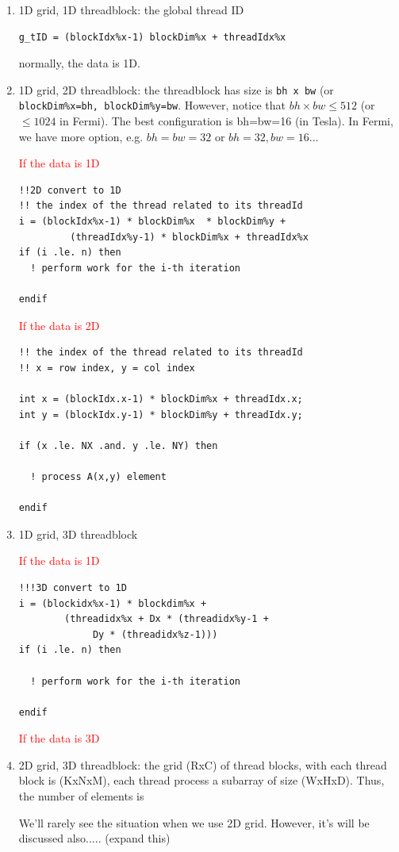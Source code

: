 \begin{enumerate}
\item 1D grid, 1D threadblock: the global thread ID
\begin{lstlisting}
g_tID = (blockIdx%x-1) blockDim%x + threadIdx%x
\end{lstlisting}
normally, the data is 1D. 

\item 1D grid, 2D threadblock: the threadblock has size is
  \verb!bh x bw! (or \verb!blockDim%x=bh, blockDim%y=bw!. However,
  notice that $bh\times bw \le 512$ (or $\le
  1024$ in Fermi). The best configuration is bh=bw=16 (in Tesla). In
  Fermi, we have more option, e.g. $bh=bw=32$ or $bh=32, bw=16$...

  \textcolor{red}{If the data is 1D}
\begin{lstlisting}
!!2D convert to 1D
!! the index of the thread related to its threadId
i = (blockIdx%x-1) * blockDim%x  * blockDim%y + 
         (threadIdx%y-1) * blockDim%x + threadIdx%x 
if (i .le. n) then
  ! perform work for the i-th iteration

endif
\end{lstlisting}


  \textcolor{red}{If the data is 2D}
\begin{lstlisting}
!! the index of the thread related to its threadId
!! x = row index, y = col index

int x = (blockIdx.x-1) * blockDim%x + threadIdx.x;
int y = (blockIdx.y-1) * blockDim%y + threadIdx.y;

if (x .le. NX .and. y .le. NY) then

  ! process A(x,y) element

endif
\end{lstlisting}


\item 1D grid, 3D threadblock

\textcolor{red}{If the data is 1D}
\begin{lstlisting}
!!!3D convert to 1D
i = (blockidx%x-1) * blockdim%x + 
        (threadidx%x + Dx * (threadidx%y-1 +
             Dy * (threadidx%z-1)))
if (i .le. n) then

  ! perform work for the i-th iteration

endif
\end{lstlisting}

\textcolor{red}{If the data is 3D}

\item 2D grid, 3D threadblock: the grid (RxC) of thread blocks, with
  each thread block is (KxNxM), each thread process a subarray of size
  (WxHxD). Thus, the number of elements is

  We'll rarely see the situation when we use 2D grid. However, it's will
  be discussed also..... (expand this)
\end{enumerate}


